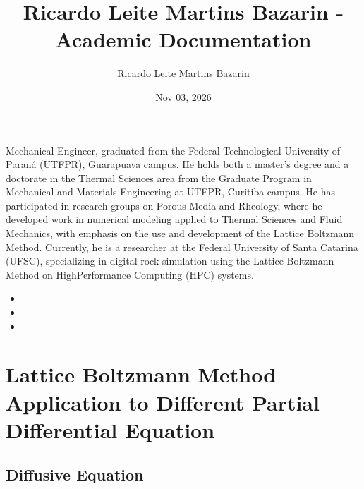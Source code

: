 \documentclass[letterpaper,10pt,english,openany,oneside]{jupyterBook}
\title{Ricardo Leite Martins Bazarin - Academic Documentation}
\date{Nov 03, 2026}
\author{Ricardo Leite Martins Bazarin}
\let\sphinxpxdimen\pdfpxdimen\else\newdimen\sphinxpxdimen
\begin{document}
\pagestyle{empty}
\sphinxmaketitle
\pagestyle{plain}
\sphinxtableofcontents
\pagestyle{normal}
\label{\detokenize{index::doc}}


\noindent{\sphinxincludegraphics[width=250\sphinxpxdimen]{{personalphoto}.png}\hspace*{\fill}}

\sphinxAtStartPar
Mechanical Engineer, graduated from the Federal Technological University of Paraná (UTFPR), Guarapuava campus. He holds both
a master’s degree and a doctorate in the Thermal Sciences area from the Graduate Program in Mechanical and Materials Engineering
at UTFPR, Curitiba campus. He has participated in research groups on Porous Media and Rheology, where he developed work in
numerical modeling applied to Thermal Sciences and Fluid Mechanics, with emphasis on the use and development of the Lattice
Boltzmann Method. Currently, he is a researcher at the Federal University of Santa Catarina (UFSC), specializing in digital
rock simulation using the Lattice Boltzmann Method on High\sphinxhyphen{}Performance Computing (HPC) systems.
\begin{itemize}
\item {} 
\sphinxAtStartPar
{}

\item {} 
\sphinxAtStartPar
{}

\item {} 
\sphinxAtStartPar
{}

\end{itemize}

\sphinxstepscope


\part{Lattice Boltzmann Method \sphinxhyphen{} Application to Different Partial Differential Equation}

\sphinxstepscope


\chapter{Diffusive Equation}
\label{\detokenize{LBM-Study/Diffusive-Equation:diffusive-equation}}\label{\detokenize{LBM-Study/Diffusive-Equation::doc}}
\end{document}
